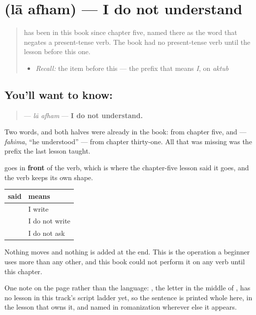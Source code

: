 \section[\texorpdfstring{\ar{لا} \ar{أفهم} (lā afham)}{لا أفهم (lā afham)}]{  (lā afham) — I do not understand}

\label{lesson:AR-C37-la-afham}



\begin{quote}
\textbf{} has been in this book since chapter five, named there as the word that negates a present-tense verb. The book had no present-tense verb until the lesson before this one.

\begin{itemize}
\raggedright
  \item \emph{Recall:} the item before this — the prefix that means \emph{I}, on \emph{aktub}
\end{itemize}
\end{quote}

\subsection*{You'll want to know:  }
\begin{quote}
\textbf{ } — \emph{lā afham} — \textbf{I do not understand.}
\end{quote}

Two words, and both halves were already in the book: \textbf{} from chapter five, and \textbf{} — \emph{fahima}, \textquotedblleft{}he understood\textquotedblright{} — from chapter thirty-one. All that was missing was the prefix the last lesson taught.

\textbf{} goes in \textbf{front} of the verb, which is where the chapter-five lesson said it goes, and the verb keeps its own shape.

\begin{grammarlens}[title={Grammar Lens: the same operation on every verb you own}]
\noindent
\begin{tabularx}{\linewidth}{@{}>{\raggedright\arraybackslash}X>{\raggedright\arraybackslash}X@{}}
\toprule
\textbf{said} & \textbf{means} \\
\midrule
\textbf{\ar{أكتب}} & I write \\
\textbf{\ar{لا} \ar{أكتب}} & I do not write \\
\textbf{\ar{لا} \ar{أسأل}} & I do not ask \\
\bottomrule
\end{tabularx}

Nothing moves and nothing is added at the end. This is the operation a beginner uses more than any other, and this book could not perform it on any verb until this chapter.

One note on the page rather than the language: \textbf{}, the letter in the middle of \textbf{}, has no lesson in this track's script ladder yet, so the sentence is printed whole here, in the lesson that owns it, and named in romanization wherever else it appears.
\end{grammarlens}

